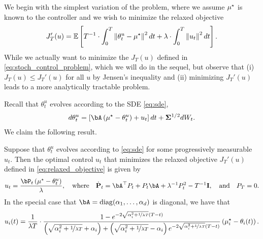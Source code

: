 We begin with the simplest variation of the problem, where we assume $\mu^{\star}$ is known to the controller and we wish to minimize the relaxed objective
\begin{align}\label{eq:relaxed_objective}
    J_T'(u) = \mathbb{E}\left[ T^{-1} \cdot\int_0^T \left\|\theta_t^u - \mu^{\star}\right\|^2 d t + \lambda \cdot \int_0^T \left\|u_t\right\|^2 d t \right].
\end{align}
While we actually want to minimize the $J_T(u)$ defined in \eqref{eq:stoch_control_problem}, which we will do in the sequel, but observe that (i) $J_T(u) \leq J_T'(u)$ for all $u$ by Jensen's inequality and (ii) minimizing $J_T'(u)$ leads to a more analytically tractable problem.

Recall that $\theta_t^u$ evolves according to the SDE \eqref{eq:sde},
\begin{align}
    d \theta_t^u = \left[ \bA \left( \mustar - \theta_t^u \right) + u_t \right] d t + \bSigma^{1/2} d W_t.
\end{align}
We claim the following result.
\begin{theorem}\label{thm:optimal_control_relaxed}
    Suppose that $\theta_t^u$ evolves according to \eqref{eq:sde} for some progressively measurable $u_t$.  Then the optimal control $u_t$ that minimizes the relaxed objective $J_T'(u)$ defined in \eqref{eq:relaxed_objective} is given by
    \begin{align}\label{eq:optimal_control_relaxed}
        u_t = \frac{\bP_t \left( \mustar - \theta_t^u \right)}{\lambda}, \quad \text{where} \quad \bPdot_t = \bA^\top P_t + P_t \bA + \lambda^{-1} P_t^2 - T^{-1} \eye, \quad \text{and} \quad P_T = 0.
    \end{align}
    In the special case that $\bA = \diag(\alpha_1, \dots, \alpha_d)$ is diagonal, we have that
    \begin{align}\label{eq:optimal_control_relaxed_diagonal}
        u_i(t) = \frac{1}{\lambda T} \cdot \frac{1 - e^{- 2 \sqrt{\alpha_i^2 + \nicefrac{1}{\lambda T}} (T -t)}}{\left( \sqrt{\alpha_i^2 + \nicefrac{1}{\lambda T}} + \alpha_i \right) + \left( \sqrt{\alpha_i^2 + \nicefrac{1}{\lambda T}} - \alpha_i \right) e^{- 2 \sqrt{\alpha_i^2 + \nicefrac{1}{\lambda T}} (T - t)}} \left( \mu^{\star}_i - \theta_i(t) \right).
    \end{align}
\end{theorem}
